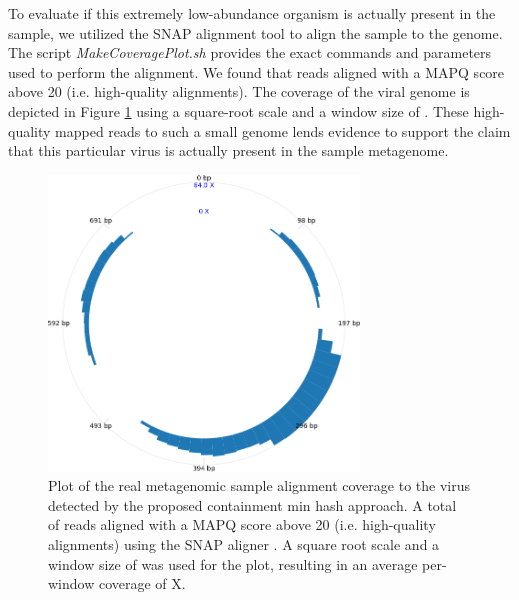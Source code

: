 \documentclass[11pt,reqno]{amsart}
\theoremstyle{remark}
\numberwithin{equation}{section}
\newcommand{\FoundOrganismName}{\protect }
\newcommand{\MeanCoverage}{\protect }
\newcommand{\NumReadsAligned}{\protect }
\newcommand{\WindowSize}{\protect }
\begin{document}

To evaluate if this extremely low-abundance organism is actually present in the sample, we utilized the SNAP alignment tool \cite{zaharia2011faster} to align the sample to the \textit{\FoundOrganismName} genome. The script \textit{MakeCoveragePlot.sh} provides the exact commands and parameters used to perform the alignment. We found that \NumReadsAligned reads aligned with a MAPQ score above 20 (i.e. high-quality alignments). The coverage of the viral genome is depicted in Figure \ref{fig:ViralCoverage} using a square-root scale and a window size of \WindowSize\unskip. 
These high-quality mapped reads to such a small genome lends evidence to support the claim that this particular virus is actually present in the sample metagenome.

\begin{figure}[!h]%
\begin{center}
\includegraphics[width=3.25in,trim={0 0 0 0in},clip]{Figs/CoveragePlot.png}%
\end{center}
\caption{Plot of the real metagenomic sample alignment coverage to the virus \textit{\FoundOrganismName} detected by the proposed containment min hash approach. A total of \NumReadsAligned reads aligned with a MAPQ score above 20 (i.e. high-quality alignments) using the SNAP aligner \cite{zaharia2011faster}. A square root scale and a window size of \WindowSize was used for the plot, resulting in an average per-window coverage of \MeanCoverage \unskip X.
}
\label{fig:ViralCoverage}%
\end{figure}
\end{document}
